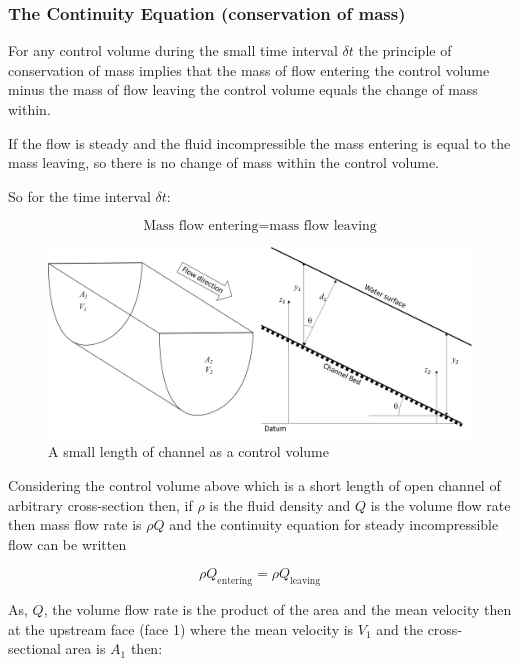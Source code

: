 \documentclass[a4paper, 12pt, british]{article} %
\numberwithin{equation}{section}
\numberwithin{figure}{section}
\numberwithin{table}{section}
\begin{document}
\subsubsection{The Continuity Equation (conservation of mass)}

For any control volume during the small time interval $\delta t$ the principle of conservation of mass implies that the mass of flow entering the control volume minus the mass of flow leaving the control volume equals the change of mass within.

If the flow is steady and the fluid incompressible the mass entering is equal to the mass leaving, so there is no change of mass within the control volume. 

So for the time interval $\delta t$:


 \begin{equation*}
 \text{Mass flow entering} = \text{mass flow leaving}
 \end{equation*}
 
 \begin{figure}[H]
 	\centering
 	\includegraphics[scale=0.45]{./images/channel_cv_2018.png}
 	\caption{A small length of channel as a control volume}
 	\label{fig:141}
 \end{figure}


Considering the control volume above which is a short length of open channel of arbitrary cross-section then, if $\rho$ is the fluid density and $Q$ is the volume flow rate then
mass flow rate is $\rho Q$ and the continuity equation for steady incompressible flow can be written

 \begin{equation}
\rho Q_\text{entering} = \rho Q_\text{leaving}
\end{equation} 

As, $Q$, the volume flow rate is the product of the area and the mean velocity then at the upstream face (face 1) where the mean velocity is $V_1$ and the cross-sectional area is $A_1$ then:
 
\end{document}
